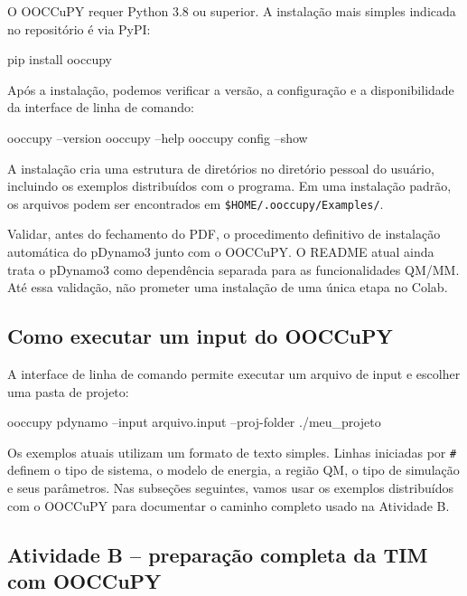 \documentclass[a4paper,11pt]{refart}
\newcommand{\code}[1]{\texttt{#1}}
\begin{document}
O OOCCuPY requer Python 3.8 ou superior. A instalação mais simples indicada no repositório é via PyPI:

\begin{commandshell}
pip install ooccupy
\end{commandshell}

Após a instalação, podemos verificar a versão, a configuração e a disponibilidade da interface de linha de comando:

\begin{commandshell}
ooccupy --version
ooccupy --help
ooccupy config --show
\end{commandshell}

A instalação cria uma estrutura de diretórios no diretório pessoal do usuário, incluindo os exemplos distribuídos com o programa. Em uma instalação padrão, os arquivos podem ser encontrados em \code{\$HOME/.ooccupy/Examples/}.

\begin{todobox}
Validar, antes do fechamento do PDF, o procedimento definitivo de instalação automática do pDynamo3 junto com o OOCCuPY. O README atual ainda trata o pDynamo3 como dependência separada para as funcionalidades QM/MM. Até essa validação, não prometer uma instalação de uma única etapa no Colab.
\end{todobox}

\subsection{Como executar um input do OOCCuPY}

A interface de linha de comando permite executar um arquivo de input e escolher uma pasta de projeto:

\begin{commandshell}
ooccupy pdynamo --input arquivo.input --proj-folder ./meu_projeto
\end{commandshell}

Os exemplos atuais utilizam um formato de texto simples. Linhas iniciadas por \code{\#} definem o tipo de sistema, o modelo de energia, a região QM, o tipo de simulação e seus parâmetros. Nas subseções seguintes, vamos usar os exemplos distribuídos com o OOCCuPY para documentar o caminho completo usado na Atividade B.

\subsection{Atividade B -- preparação completa da TIM com OOCCuPY}
\end{document}
